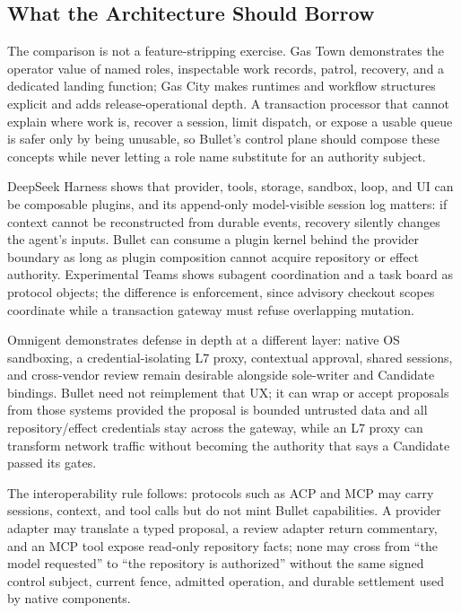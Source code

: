 \documentclass[journal]{IEEEtran}
\begin{document}
\subsection{What the Architecture Should Borrow}

The comparison is not a feature-stripping exercise. Gas Town demonstrates the
operator value of named roles, inspectable work records, patrol, recovery, and
a dedicated landing function; Gas City makes runtimes and workflow structures
explicit and adds release-operational depth. A transaction processor that
cannot explain where work is, recover a session, limit dispatch, or expose a
usable queue is safer only by being unusable, so Bullet's control plane should
compose these concepts while never letting a role name substitute for an
authority subject.

DeepSeek Harness shows that provider, tools, storage, sandbox, loop, and UI can
be composable plugins, and its append-only model-visible session log matters:
if context cannot be reconstructed from durable events, recovery silently
changes the agent's inputs. Bullet can consume a plugin kernel behind the
provider boundary as long as plugin composition cannot acquire repository or
effect authority. Experimental Teams shows subagent coordination and a task
board as protocol objects; the difference is enforcement, since advisory
checkout scopes coordinate while a transaction gateway must refuse overlapping
mutation.

Omnigent demonstrates defense in depth at a different layer: native OS
sandboxing, a credential-isolating L7 proxy, contextual approval, shared
sessions, and cross-vendor review remain desirable alongside sole-writer and
Candidate bindings. Bullet need not reimplement that UX; it can wrap or accept
proposals from those systems provided the proposal is bounded untrusted data
and all repository/effect credentials stay across the gateway, while an L7
proxy can transform network traffic without becoming the authority that says
a Candidate passed its gates.

The interoperability rule follows: protocols such as ACP and MCP may carry
sessions, context, and tool calls but do not mint Bullet capabilities. A
provider adapter may translate a typed proposal, a review adapter return
commentary, and an MCP tool expose read-only repository facts; none may cross
from ``the model requested'' to ``the repository is authorized'' without the
same signed control subject, current fence, admitted operation, and durable
settlement used by native components.
\end{document}
